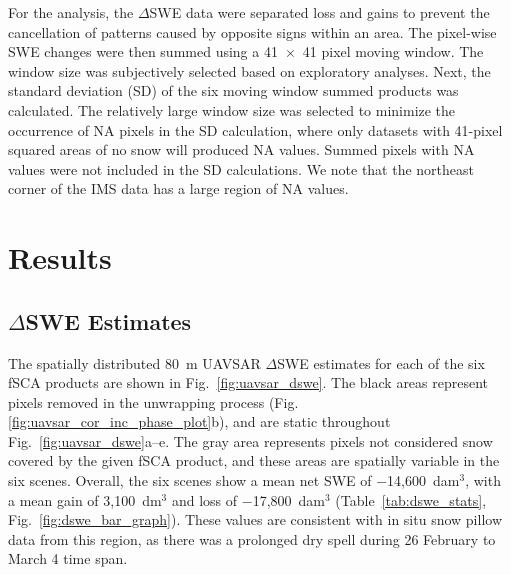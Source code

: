 For the analysis, the $\Delta$SWE data were separated loss and gains to prevent the cancellation of patterns caused by opposite signs within an area. The pixel-wise SWE changes were then summed using a 41~$\times$~41 pixel moving window. The window size was subjectively selected based on exploratory analyses. Next, the standard deviation (SD) of the six moving window summed products was calculated. The relatively large window size was selected to minimize the occurrence of NA pixels in the SD calculation, where only datasets with 41-pixel squared areas of no snow will produced NA values. Summed pixels with NA values were not included in the SD calculations. We note that the northeast corner of the IMS data has a large region of NA values.

\hypertarget{ch4-results}{\section{Results}\label{ch4-results}}
\hypertarget{ch4-results}{\subsection{$\Delta$SWE Estimates}\label{ch4-results}}

The spatially distributed 80~m UAVSAR $\Delta$SWE estimates for each of the six fSCA products are shown in Fig.~\ref{fig:uavsar_dswe}. The black areas represent pixels removed in the unwrapping process (Fig. \ref{fig:uavsar_cor_inc_phase_plot}b), and are static throughout Fig.~\ref{fig:uavsar_dswe}a--e. The gray area represents pixels not considered snow covered by the given fSCA product, and these areas are spatially variable in the six scenes. Overall, the six scenes show a mean net SWE of $-$14,600~dam$^{3}$, with a mean gain of 3,100~dm$^{3}$ and loss of $-$17,800~dam$^{3}$ (Table~\ref{tab:dswe_stats}, Fig.~\ref{fig:dswe_bar_graph}). These values are consistent with in situ snow pillow data from this region, as there was a prolonged dry spell during 26 February to March 4 time span.

